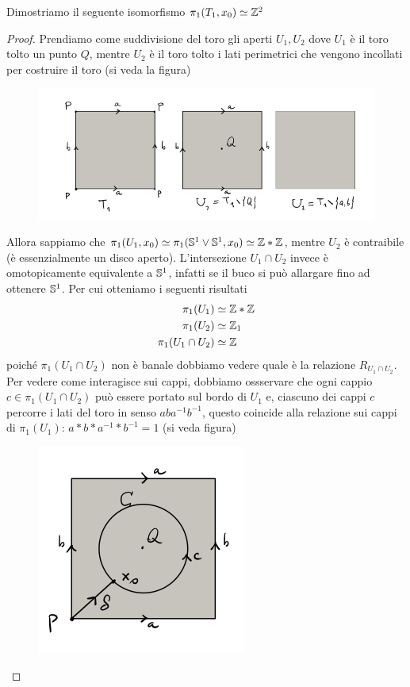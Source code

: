 \begin{xca}
	Dimostriamo il seguente isomorfismo $\pi_1(T_1, x_0) \simeq \Z^2$
\end{xca}
\begin{proof}
	Prendiamo come suddivisione del toro gli aperti $U_1, U_2$ dove $U_1$ è il toro tolto un punto $Q$, mentre $U_2$ è il toro tolto i lati perimetrici che vengono incollati per costruire il toro (si veda la figura)
	\begin{figure}[h]
		\centering
		\includegraphics[width=0.7\linewidth]{images/topologia_algebrica/fundamental-group-torus}
		\caption{}
		\label{fig:fundamental-group-torus}
	\end{figure}
	Allora sappiamo che $\pi_1(U_1,x_0) \simeq \pi_1(\S^1 \lor \S^1, x_0) \simeq \Z \ast \Z$, mentre $U_2$ è contraibile (è essenzialmente un disco aperto). L'intersezione $U_1 \cap U_2$ invece è omotopicamente equivalente a $\S^1$, infatti se il buco si può allargare fino ad ottenere $\S^1$. Per cui otteniamo i seguenti risultati
	\begin{align*}
		\pi_1(U_1) & \simeq \Z \ast \Z \\
		\pi_1(U_2) & \simeq \Z_1 \\
		\pi_1(U_1 \cap U_2) &\simeq \Z \\
	\end{align*}
	poiché $\pi_1(U_1 \cap U_2)$ non è banale dobbiamo vedere quale è la relazione $R_{U_1 \cap U_2}$. Per vedere come interagisce sui cappi, dobbiamo ossservare che ogni cappio $c \in \pi_1(U_1 \cap U_2)$ può essere portato sul bordo di $U_1$ e, ciascuno dei cappi $c$ percorre i lati del toro in senso $aba^{-1}b^{-1}$, questo coincide alla relazione sui cappi di $\pi_1(U_1)$: $a \ast b \ast a^{-1} \ast b^{-1} = 1$ (si veda figura)
	\begin{figure}[h]
		\centering
		\includegraphics[width=0.4\linewidth]{images/topologia_algebrica/fundamental-group-torus-2}

\end{figure}
\end{proof}

